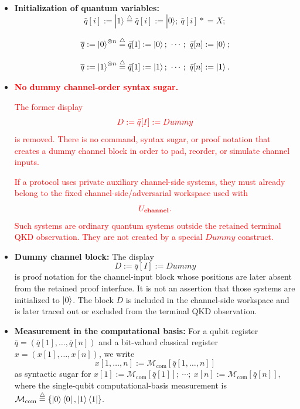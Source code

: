 \documentclass[acmsmall,screen,review,anonymous,nonacm]{acmart}
\theoremstyle{defn_style}
\newcommand{\asteq}{\mathrel{*}=}
\begin{document}
\begin{itemize}

    \item \textbf{Initialization of quantum variables:}
    \[
    \bar q[i]:=|1\rangle\stackrel{\triangle}{=}
    \bar q[i]:=|0\rangle;\ \bar q[i]\asteq X;
    \]
    
    \[
    \overline{q} := \ket{0}^{\otimes n}
    \stackrel{\triangle}{=}
    \bar{q}[1] := \ket{0};\ \cdots;\ \bar{q}[n] := \ket{0};\]

    \[
    \overline{q} := \ket{1}^{\otimes n}
    \stackrel{\triangle}{=}
    \bar{q}[1] := \ket{1};\ \cdots;\ \bar{q}[n] := \ket{1}.\]

    \item \textcolor{red}{\textbf{No dummy channel-order syntax sugar.}}
    
    \textcolor{red}{The former display}
    \[
    \textcolor{red}{
    D:=\bar q[I]:=Dummy
    }
    \]
    \textcolor{red}{is removed. There is no command, syntax sugar, or proof notation that
    creates a dummy channel block in order to pad, reorder, or simulate channel
    inputs.}
    
    \textcolor{red}{If a protocol uses private auxiliary channel-side systems, they must already
    belong to the fixed channel-side/adversarial workspace used with}
    \[
    \textcolor{red}{
    U_{\textbf{channel}}.
    }
    \]
    \textcolor{red}{Such systems are ordinary quantum systems outside the retained terminal QKD
    observation. They are not
    created by a special \(Dummy\) construct.}

    \item \textbf{Dummy channel block:}
    The display
    \[
    D:=\bar q[I]:=Dummy
    \]
    is proof notation for the channel-input block whose positions are later absent
    from the retained proof interface. It is not an assertion that those systems
    are initialized to \(\ket0\). The block \(D\) is included in the channel-side
    workspace and is later traced out or excluded from the terminal QKD observation.
    
    \item \textbf{Measurement in the computational basis:}
    For a qubit register
    \(\bar q=(\bar q[1],\ldots,\bar q[n])\)
    and a bit-valued classical register
    \(x=(x[1],\ldots,x[n])\), we write
    \[
    x[1,\ldots,n]
    :=
    \mathcal M_{\mathrm{com}}[\bar q[1,\ldots,n]]\]
    as syntactic sugar for
    \(x[1]:=\mathcal M_{\mathrm{com}}[\bar q[1]];
    \ \cdots;\
    x[n]:=\mathcal M_{\mathrm{com}}[\bar q[n]],\)
    where the single-qubit computational-basis measurement is
    \(\mathcal M_{\mathrm{com}}
    \stackrel{\triangle}{=}
    \{\ket 0\bra 0,\ket 1\bra 1\}.\)


\end{itemize}
\end{document}
